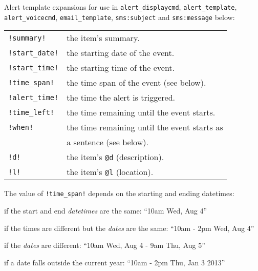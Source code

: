 \documentclass[10pt,landscape]{article}
\begin{document}
\begin{multicols}{3}
Alert template expansions for use in \verb!alert_displaycmd!, \verb'alert_template', \verb!alert_voicecmd!, \verb!email_template!, \verb'sms:subject' and \verb'sms:message' below:

\begin{tabular}{@{}ll@{}}
\verb'!summary!'      & the item's summary. \\
\verb'!start_date!'   & the starting date of the event. \\
\verb'!start_time!'   & the starting time of the event. \\
\verb'!time_span!'    & the time span of the event (see below). \\
\verb'!alert_time!'   & the time the alert is triggered. \\
\verb'!time_left!'    & the time remaining until the event starts. \\
\verb'!when!'         & the time remaining until the event starts as \\
                        & a sentence (see below). \\
\verb'!d!'            & the item's \verb!@d! (description). \\
\verb'!l!'            & the item's \verb!@l! (location). \\
\end{tabular}

\vskip3pt
The value of \verb'!time_span!' depends on the starting and ending datetimes:
\begin{compactitem}
\item if the start and end \emph{datetimes} are the same: ``10am Wed, Aug 4''
\item if the times are different but the \emph{dates} are the same: ``10am - 2pm Wed, Aug 4''
\item if the \emph{dates} are different: ``10am Wed, Aug 4 - 9am Thu, Aug 5''
\item if a date falls outside the current year: ``10am - 2pm Thu, Jan 3 2013''
\end{compactitem}


\end{multicols}
\end{document}
